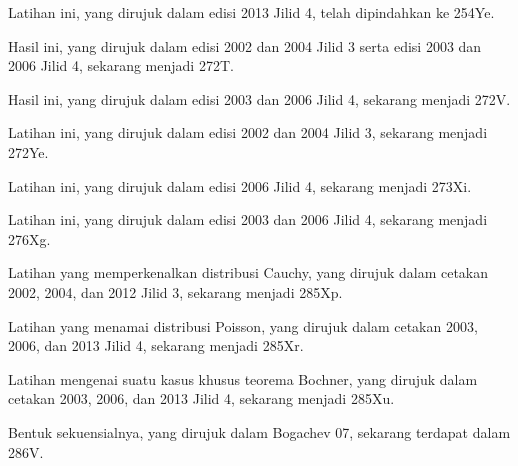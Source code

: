 
 Latihan ini, yang dirujuk dalam edisi 2013
Jilid 4, telah dipindahkan ke 254Ye.

Hasil ini, yang dirujuk dalam edisi 2002 dan 2004 Jilid 3 serta edisi 2003
dan 2006 Jilid 4, sekarang menjadi 272T.

 Hasil ini, yang dirujuk dalam edisi 2003 dan
2006 Jilid 4, sekarang menjadi 272V.

 Latihan ini, yang dirujuk dalam edisi 2002 dan 2004
Jilid 3, sekarang menjadi 272Ye.

 Latihan ini, yang dirujuk dalam edisi 2006 Jilid 4,
sekarang menjadi 273Xi.

 Latihan ini, yang dirujuk dalam edisi 2003 dan 2006
Jilid 4, sekarang menjadi 276Xg.

 Latihan yang memperkenalkan distribusi
Cauchy, yang dirujuk dalam cetakan 2002, 2004, dan 2012 Jilid 3, sekarang
menjadi 285Xp.

 Latihan yang menamai distribusi
Poisson, yang dirujuk dalam cetakan 2003, 2006, dan 2013 Jilid 4, sekarang
menjadi 285Xr.

 Latihan mengenai suatu kasus khusus
teorema Bochner, yang dirujuk dalam cetakan 2003, 2006, dan 2013 Jilid 4,
sekarang menjadi 285Xu.

 Bentuk sekuensialnya, yang dirujuk dalam
{\smc Bogachev 07}, sekarang terdapat dalam 286V.

\fi

